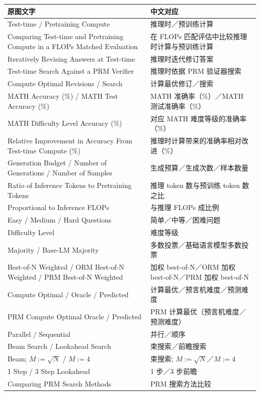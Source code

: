 \begin{longtable}{p{.47\linewidth}p{.47\linewidth}}
\toprule
原图文字 & 中文对应\\
\midrule
\endhead
Test-time / Pretraining Compute & 推理时／预训练计算\\
Comparing Test-time and Pretraining Compute in a FLOPs Matched Evaluation & 在 FLOPs 匹配评估中比较推理时计算与预训练计算\\
Iteratively Revising Answers at Test-time & 推理时迭代修订答案\\
Test-time Search Against a PRM Verifier & 推理时依据 PRM 验证器搜索\\
Compute Optimal Revisions / Search & 计算最优修订／搜索\\
MATH Accuracy (\%) / MATH Test Accuracy (\%) & MATH 准确率（\%）／MATH 测试准确率（\%）\\
MATH Difficulty Level Accuracy (\%) & 对应 MATH 难度等级的准确率（\%）\\
Relative Improvement in Accuracy From Test-time Compute (\%) & 推理时计算带来的准确率相对改进（\%）\\
Generation Budget / Number of Generations / Number of Samples & 生成预算／生成次数／样本数量\\
Ratio of Inference Tokens to Pretraining Tokens & 推理 token 数与预训练 token 数之比\\
Proportional to Inference FLOPs & 与推理 FLOPs 成比例\\
Easy / Medium / Hard Questions & 简单／中等／困难问题\\
Difficulty Level & 难度等级\\
Majority / Base-LM Majority & 多数投票／基础语言模型多数投票\\
Best-of-N Weighted / ORM Best-of-N Weighted / PRM Best-of-N Weighted & 加权 best-of-N／ORM 加权 best-of-N／PRM 加权 best-of-N\\
Compute Optimal / Oracle / Predicted & 计算最优／预言机难度／预测难度\\
PRM Compute Optimal Oracle / Predicted & PRM 计算最优（预言机难度／预测难度）\\
Parallel / Sequential & 并行／顺序\\
Beam Search / Lookahead Search & 束搜索／前瞻搜索\\
Beam; $M:=\sqrt N$ / $M:=4$ & 束搜索; $M:=\sqrt N$／$M:=4$\\
1 Step / 3 Step Lookahead & 1 步／3 步前瞻\\
Comparing PRM Search Methods & PRM 搜索方法比较\\

\end{longtable}
